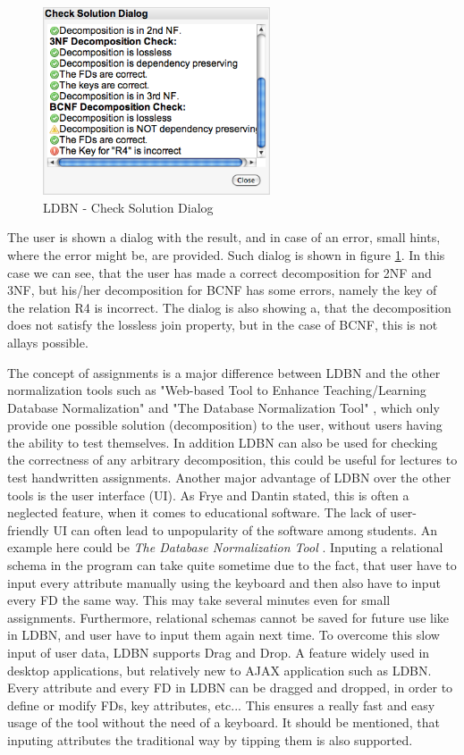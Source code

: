 \begin{figure}[h]
	\begin{center}
		\includegraphics[width=0.6\textwidth]{./img/screen03.png}
		\caption{LDBN - Check Solution Dialog}
		\label{fig:screen03}
	\end{center}
\end{figure}

The user is shown a dialog with the result, and in case of an error, small hints,
where the error might be, are provided. Such dialog is shown in figure \ref{fig:screen03}. In this case
we can see, that the user has made a correct decomposition for 2NF and 3NF,
but his/her decomposition for BCNF has some errors, namely the key of the relation R4 is
incorrect. The dialog is also showing a, that the decomposition does not 
satisfy the lossless join property, but in the case of BCNF, this
is not allays possible. 

The concept of assignments is a major
difference between LDBN and the other normalization tools such as 
"Web-based Tool to Enhance Teaching/Learning Database 
Normalization" \cite{p8} and "The Database Normalization Tool" \cite{w1}, 
which only provide 
one possible solution (decomposition) to the user, without users having the ability to test 
themselves. In addition LDBN can also be used for checking the correctness of any
arbitrary decomposition, this could be useful for lectures to test handwritten assignments. 
Another major advantage of LDBN over the other tools is the user interface (UI). 
As Frye \cite{p10} and Dantin \cite{p9} stated, this is often a
neglected feature, when it comes to educational software. The lack of user-friendly UI 
can often lead to unpopularity of the software among students. An example here could be 
\textit{The Database Normalization Tool} \cite{w1}. Inputing a relational schema in the program can
take quite sometime due to the fact, that
user have to input every attribute manually using the keyboard and then also 
have to input every FD the same way. This may take several minutes even for small 
assignments. Furthermore, relational schemas cannot be saved for future use like 
in LDBN, and user have to input them again next time. To overcome this slow input of user data, 
LDBN supports Drag and Drop. A feature widely used in desktop
applications, but relatively new to AJAX application such as LDBN. Every attribute
and every FD in LDBN can be dragged and dropped, in order 
to define or modify FDs, key attributes, etc... This ensures a really fast and easy
usage of the tool without the need of a keyboard. It should be mentioned,
that inputing attributes the traditional way by tipping them is also supported.

